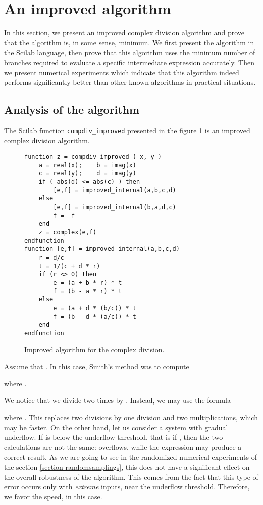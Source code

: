 \documentclass{paper}
\newcommand{\scivar}[1]{\texttt{#1}}
\begin{document}
\section{An improved algorithm}
\label{section-impalgo}

In this section, we present an improved complex division 
algorithm and prove that the algorithm is, in some sense, 
minimum. 
We first present the algorithm in the Scilab language, then 
prove that this algorithm uses the minimum number 
of branches required to evaluate a specific intermediate expression 
accurately. 
Then we present numerical experiments which indicate that this 
algorithm indeed performs significantly better than other 
known algorithms in practical situations.

\subsection{Analysis of the algorithm}

The Scilab function \scivar{compdiv\_improved} presented in the figure \ref{fig-compdiv-algoimproved} 
is an improved complex division algorithm. 

\begin{figure}
\caption{Improved algorithm for the complex division.}
\label{fig-compdiv-algoimproved}
\lstset{language=scilabscript}
\begin{lstlisting}
function z = compdiv_improved ( x, y )
    a = real(x);    b = imag(x)
    c = real(y);    d = imag(y)
    if ( abs(d) <= abs(c) ) then
        [e,f] = improved_internal(a,b,c,d)
    else
        [e,f] = improved_internal(b,a,d,c)
        f = -f
    end
    z = complex(e,f)
endfunction
function [e,f] = improved_internal(a,b,c,d)
    r = d/c
    t = 1/(c + d * r)
    if (r <> 0) then
        e = (a + b * r) * t
        f = (b - a * r) * t
    else
        e = (a + d * (b/c)) * t
        f = (b - d * (a/c)) * t
    end
endfunction
\end{lstlisting}
\end{figure}


Assume that . 
In this case, Smith's method was to compute 

where .

We notice that we divide two times by . 
Instead, we may use the formula 

where .
This replaces two divisions by one division and two multiplications, 
which may be faster. 
On the other hand, let us consider a system with gradual underflow. 
If  is below the underflow threshold, that 
is if , then the 
two calculations are not the same:  overflows, 
while the expression  may produce a correct result. 
As we are going to see in the randomized numerical experiments of the section 
\ref{section-randomsamplings}, this does not have a significant effect 
on the overall robustness of the algorithm. 
This comes from the fact that this type of error occurs 
only with \emph{extreme} inputs, near the underflow threshold.  
Therefore, we favor the speed, in this case.
\end{document}
